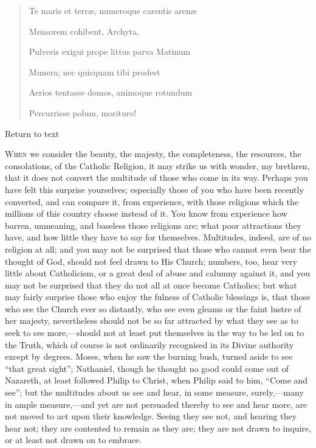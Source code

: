 
\begin{quote}

Te maris et terræ, numeroque carentis arenæ

Mensorem cohibent, Archyta,

Pulveris exigui prope littus parva Matinum

Munera; nec quicquam tibi prodest

Aerios tentasse domos, animoque rotundum

Percurrisse polum, morituro!

\end{quote}

Return to text


W\textsc{hen} we consider the beauty, the majesty, the completeness, the
resources, the consolations, of the Catholic Religion, it may strike
us with wonder, my brethren, that it does not convert the multitude of
those who come in its way. Perhaps you have felt this surprise
yourselves; especially those of you who have been recently converted,
and can compare it, from experience, with those religions which the
millions of this country choose instead of it. You know from
experience how barren, unmeaning, and baseless those religions are;
what poor attractions they have, and how little they have to say for
themselves. Multitudes, indeed, are of no religion at all; and you may
not be surprised that those who cannot even bear the thought of God,
should not feel drawn to His Church; numbers, too, hear very little
about Catholicism, or a great deal of abuse and calumny against it,
and you may not be surprised that they do not all at once become
Catholics; but what may fairly surprise those who enjoy the fulness of
Catholic blessings is, that those who see the Church ever so
distantly, who see even gleams or the faint lustre of her majesty,
nevertheless should not be so far attracted by what they see as to
seek to see more,—should not at least put themselves in the way to
be led on to the Truth, which of course is not ordinarily recognised
in its Divine authority except by degrees. Moses, when he saw the
burning bush, turned aside to see ``that great sight'';
Nathaniel, though he thought no good could come out of Nazareth, at
least followed Philip to Christ, when Philip said to him, ``Come
and see''; but the multitudes about us see and hear, in some
measure, surely,—many in ample measure,—and yet are not persuaded
thereby to see and hear more, are not moved to act upon their
knowledge. Seeing they see not, and hearing they hear not; they are
contented to remain as they are; they are not drawn to inquire, or at
least not drawn on to embrace.

